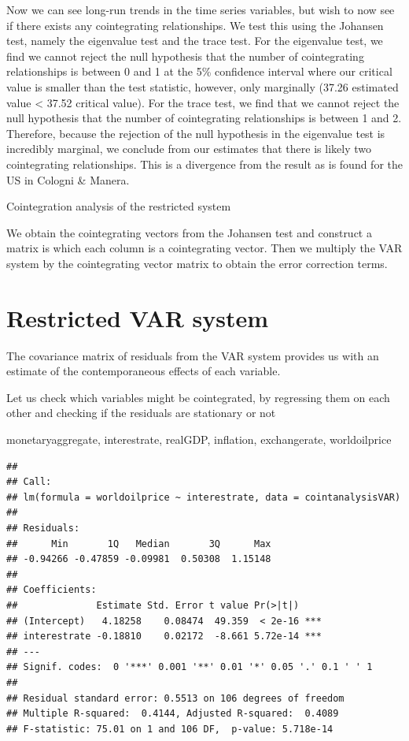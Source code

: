 \documentclass[11pt,preprint, authoryear]{elsarticle}
\numberwithin{equation}{section}
\numberwithin{figure}{section}
\numberwithin{table}{section}
\begin{document}
Now we can see long-run trends in the time series variables, but wish to
now see if there exists any cointegrating relationships. We test this
using the Johansen test, namely the eigenvalue test and the trace test.
For the eigenvalue test, we find we cannot reject the null hypothesis
that the number of cointegrating relationships is between 0 and 1 at the
5\% confidence interval where our critical value is smaller than the
test statistic, however, only marginally (37.26 estimated value
\textless{} 37.52 critical value). For the trace test, we find that we
cannot reject the null hypothesis that the number of cointegrating
relationships is between 1 and 2. Therefore, because the rejection of
the null hypothesis in the eigenvalue test is incredibly marginal, we
conclude from our estimates that there is likely two cointegrating
relationships. This is a divergence from the result as is found for the
US in Cologni \& Manera.

Cointegration analysis of the restricted system

We obtain the cointegrating vectors from the Johansen test and construct
a matrix is which each column is a cointegrating vector. Then we
multiply the VAR system by the cointegrating vector matrix to obtain the
error correction terms.

\hypertarget{restricted-var-system}{%
\section{Restricted VAR system}\label{restricted-var-system}}

The covariance matrix of residuals from the VAR system provides us with
an estimate of the contemporaneous effects of each variable.

Let us check which variables might be cointegrated, by regressing them
on each other and checking if the residuals are stationary or not

monetaryaggregate, interestrate, realGDP, inflation, exchangerate,
worldoilprice

\begin{verbatim}
## 
## Call:
## lm(formula = worldoilprice ~ interestrate, data = cointanalysisVAR)
## 
## Residuals:
##      Min       1Q   Median       3Q      Max 
## -0.94266 -0.47859 -0.09981  0.50308  1.15148 
## 
## Coefficients:
##              Estimate Std. Error t value Pr(>|t|)    
## (Intercept)   4.18258    0.08474  49.359  < 2e-16 ***
## interestrate -0.18810    0.02172  -8.661 5.72e-14 ***
## ---
## Signif. codes:  0 '***' 0.001 '**' 0.01 '*' 0.05 '.' 0.1 ' ' 1
## 
## Residual standard error: 0.5513 on 106 degrees of freedom
## Multiple R-squared:  0.4144, Adjusted R-squared:  0.4089 
## F-statistic: 75.01 on 1 and 106 DF,  p-value: 5.718e-14
\end{verbatim}
\end{document}
